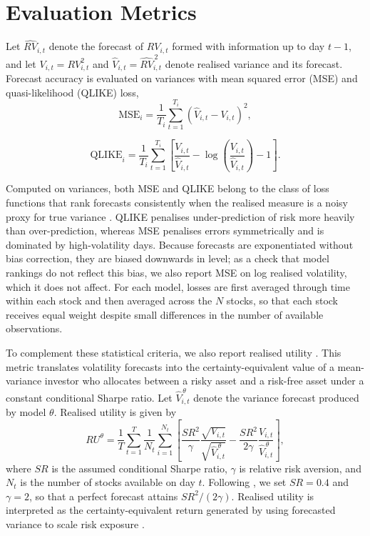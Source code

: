\documentclass[12pt]{article}
\begin{document}
\section{Evaluation Metrics}

\noindent Let $\widehat{RV}_{i,t}$ denote the forecast of $RV_{i,t}$ formed with information up to day $t-1$, and let $V_{i,t}=RV_{i,t}^{2}$ and $\widehat{V}_{i,t}=\widehat{RV}_{i,t}^{\,2}$ denote realised variance and its forecast. Forecast accuracy is evaluated on variances with mean squared error (MSE) and quasi-likelihood (QLIKE) loss,
\begin{equation}
\text{MSE}_{i}
=
\frac{1}{T_i}
\sum_{t=1}^{T_i}
\left(
\widehat{V}_{i,t}-V_{i,t}
\right)^2,
\end{equation}

\begin{equation}
\text{QLIKE}_{i}
=
\frac{1}{T_i}
\sum_{t=1}^{T_i}
\left[
\frac{V_{i,t}}{\widehat{V}_{i,t}}
-
\log\left(
\frac{V_{i,t}}{\widehat{V}_{i,t}}
\right)
-1
\right].
\end{equation}

\noindent Computed on variances, both MSE and QLIKE belong to the class of loss functions that rank forecasts consistently when the realised measure is a noisy proxy for true variance \parencite{patton-2011}. QLIKE penalises under-prediction of risk more heavily than over-prediction, whereas MSE penalises errors symmetrically and is dominated by high-volatility days. Because forecasts are exponentiated without bias correction, they are biased downwards in level; as a check that model rankings do not reflect this bias, we also report MSE on log realised volatility, which it does not affect. For each model, losses are first averaged through time within each stock and then averaged across the $N$ stocks, so that each stock receives equal weight despite small differences in the number of available observations.

To complement these statistical criteria, we also report realised utility \parencite{bollerslev-2018}. This metric translates volatility forecasts into the certainty-equivalent value of a mean-variance investor who allocates between a risky asset and a risk-free asset under a constant conditional Sharpe ratio. Let $\widehat{V}_{i,t}^{\,\theta}$ denote the variance forecast produced by model $\theta$. Realised utility is given by
\begin{equation}
RU^\theta
=
\frac{1}{T}
\sum_{t=1}^{T}
\frac{1}{N_t}
\sum_{i=1}^{N_t}
\left[
\frac{SR^2}{\gamma}
\frac{\sqrt{V_{i,t}}}
{\sqrt{\widehat{V}_{i,t}^{\,\theta}}}
-
\frac{SR^2}{2\gamma}
\frac{V_{i,t}}
{\widehat{V}_{i,t}^{\,\theta}}
\right],
\end{equation}
where $SR$ is the assumed conditional Sharpe ratio, $\gamma$ is relative risk aversion, and $N_t$ is the number of stocks available on day $t$. Following \textcite{zhang-2023}, we set $SR=0.4$ and $\gamma=2$, so that a perfect forecast attains $SR^2/(2\gamma)$. Realised utility is interpreted as the certainty-equivalent return generated by using forecasted variance to scale risk exposure \parencite{bollerslev-2018}.
\end{document}
